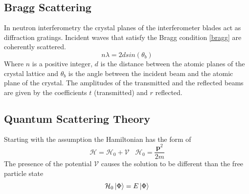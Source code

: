 \subsection{Bragg Scattering}
In neutron interferometry the crystal planes of the interferometer blades act as diffraction gratings. Incident waves that satisfy the Bragg condition \ref{bragg} are coherently scattered.
\begin{equation}
\label{bragg}
n\lambda = 2d sin(\theta_{b})
\end{equation} 
Where $n$ is a positive integer, $d$ is the distance between the atomic planes of the crystal lattice and $\theta_{b}$ is the angle between the incident beam and the atomic plane of the crystal. The amplitudes of the transmitted and the reflected beams are given by the coefficients $t$ (transmitted) and $r$ reflected.\cite{dimaThesis} 

\subsection{Quantum Scattering Theory}
\label{sec:scatteringTheory}
 Starting with the assumption the Hamiltonian has the form of 
 \begin{equation}
 \mathcal{H} = \mathcal{H}_0+\mathcal{V} \,\,\,\,\, \mathcal{H}_0= \frac{\textbf{p}^2}{2m}
 \label{eq:hamiltonian}
 \end{equation}
The presence of the potential $\mathcal{V}$ causes the solution to be different than the free particle state 
$$\mathcal{H}_0\Ket{\Phi}=E\Ket{\Phi}$$

